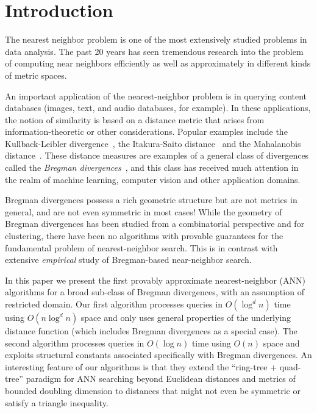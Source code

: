 \documentclass[11pt]{myclass}
\begin{document}
\section{Introduction}
\label{Introduction}
The nearest neighbor problem is one of the most extensively studied problems in data analysis. The past 20 years has seen tremendous research into the problem of computing near neighbors efficiently as well as approximately in different kinds of metric spaces.

An important application of the nearest-neighbor problem is in querying content databases (images, text, and audio databases, for example). In these applications, the notion of similarity is  based on a distance metric that arises from information-theoretic or other considerations. Popular examples include the Kullback-Leibler divergence~\cite{kullback}, the Itakura-Saito distance~\cite{itakura} and the Mahalanobis distance~\cite{mahalanobis36}. These distance measures are examples of a general class of divergences called the \emph{Bregman divergences}~\cite{bregman}, and this class has received much attention in the realm of machine learning, computer vision and other application domains. 


Bregman divergences possess a rich geometric structure but are not metrics in general, and are not even symmetric in most cases! While the  geometry of Bregman divergences has been studied from a combinatorial perspective and for clustering, there have been no algorithms with provable guarantees for the fundamental  problem of nearest-neighbor search. This is in contrast with extensive \emph{empirical} study of Bregman-based near-neighbor search\cite{caytonpaper,vptrees,tailoredbregmannn,spellmanvemuri,bregsearch}. 

In this paper we present the first provably approximate nearest-neighbor (ANN) algorithms for a broad sub-class of Bregman divergences, with an assumption of restricted domain. Our first algorithm processes queries in $O(\log^d n)$ time using $O(n \log^d n)$ space and only uses general properties of the underlying distance function (which includes Bregman divergences as a special case). The second algorithm processes queries in $O(\log n)$ time using $O(n)$ space and exploits structural constants associated specifically with Bregman divergences. An interesting feature of our algorithms is that they extend the ``ring-tree + quad-tree'' paradigm for ANN searching beyond Euclidean distances and metrics of bounded doubling dimension to distances that might not even be symmetric or satisfy a triangle inequality. 
\end{document}

